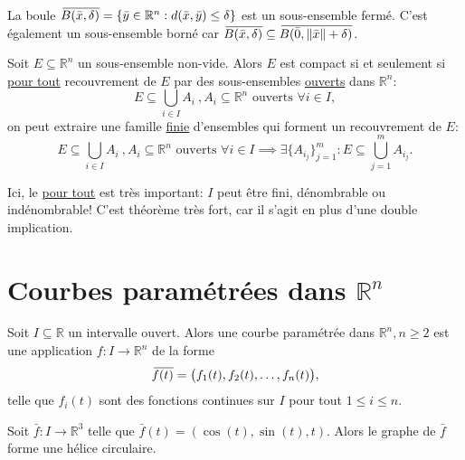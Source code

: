 \documentclass{report}
\newcommand*{\skol}[2][3]{{}\mkern#1mu\overline{\mkern-#1mu#2}} %
\newcommand*\adh[1]{\skol{#1}}
\newcommand*{\norm}[1]{\lVert#1\rVert}
\begin{document}
\begin{exmp}
	La boule $\adh{B(\bar x, \delta)} = \{\bar y \in \mathbb R^n : d(\bar x, \bar y) \leq \delta\}$ est un sous-ensemble fermé. C'est également un sous-ensemble borné car $\adh{B(\bar x, \delta)} \subseteq \adh{B(\bar 0, \norm{\bar x} + \delta)}$.
\end{exmp}

\begin{thm}
	Soit $E \subseteq \mathbb R^n$ un sous-ensemble non-vide. Alors $E$ est compact si et seulement si \underline{pour tout} recouvrement de $E$ par des sous-ensembles \underline{ouverts} dans $\mathbb R^n$:
	\begin{equation}
		E \subseteq \bigcup_{i \in I} A_i \ , A_i \subseteq \mathbb R^n \text{ ouverts } \forall i \in I,
	\end{equation}
	on peut extraire une famille \underline{finie} d'ensembles qui forment un recouvrement de $E$:
	\begin{equation}
		E \subseteq \bigcup_{i \in I} A_i \ , A_i \subseteq \mathbb R^n \text{ ouverts } \forall i \in I \implies \exists\{A_{i_j}\}_{j=1}^m : E \subseteq \bigcup_{j=1}^m A_{i_j}.
	\end{equation}
\end{thm}
\begin{remark} Ici, le \underline{pour tout} est très important: $I$ peut être fini, dénombrable ou indénombrable! C'est théorème très fort, car il s'agit en plus d'une double implication. \end{remark}

\section{Courbes paramétrées dans $\mathbb R^n$}
\begin{defn}
	Soit $I \subseteq \mathbb R$ un intervalle ouvert. Alors une courbe paramétrée dans $\mathbb R^n, n \geq 2$ est une application $f : I \to \mathbb R^n$ de la forme
	\begin{equation}
		\adh{f(t)} = \bigl(f_1(t), f_2(t), \ldots, f_n(t)\bigr),
	\end{equation}
	telle que $f_i(t)$ sont des fonctions continues sur $I$ pour tout $1 \leq i \leq n$.
\end{defn}

\begin{exmp}
	Soit $\bar f : I \to \mathbb R^3$ telle que $\bar f(t) = (\cos(t), \sin(t), t)$. Alors le graphe de $\bar f$ forme une hélice circulaire.
\end{exmp}
\end{document}
